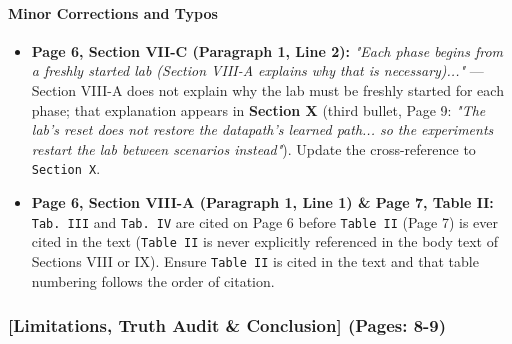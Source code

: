 \documentclass[11pt,a4paper]{article}
\begin{document}
\paragraph{Minor Corrections and Typos}
\begin{itemize}[leftmargin=1.8em,itemsep=2pt]
\item \textbf{Page 6, Section VII-C (Paragraph 1, Line 2):} \emph{"Each phase begins from a freshly started lab (Section VIII-A explains why that is necessary)..."} — Section VIII-A does not explain why the lab must be freshly started for each phase; that explanation appears in \textbf{Section X} (third bullet, Page 9: \emph{"The lab's reset does not restore the datapath's learned path... so the experiments restart the lab between scenarios instead"}). Update the cross-reference to \texttt{Section X}.
\end{itemize}
\begin{itemize}[leftmargin=1.8em,itemsep=2pt]
\item \textbf{Page 6, Section VIII-A (Paragraph 1, Line 1) \& Page 7, Table II:} \texttt{Tab. III} and \texttt{Tab. IV} are cited on Page 6 before \texttt{Table II} (Page 7) is ever cited in the text (\texttt{Table II} is never explicitly referenced in the body text of Sections VIII or IX). Ensure \texttt{Table II} is cited in the text and that table numbering follows the order of citation.
\end{itemize}
\subsubsection*{[Limitations, Truth Audit \& Conclusion] (Pages: 8-9)}
\end{document}
